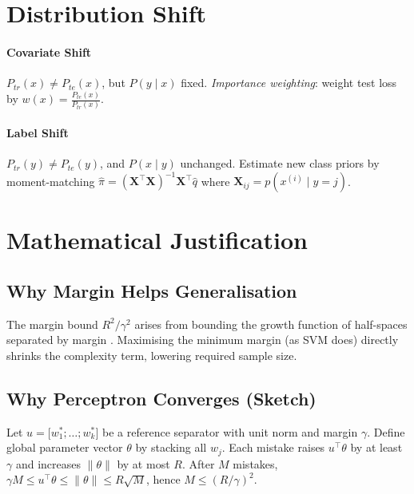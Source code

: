 \documentclass{article}
\begin{document}
\section{Distribution Shift}\label{sec:shift}
\paragraph{Covariate Shift}
$P_{tr}(x)\neq P_{te}(x)$, but $P(y\mid x)$ fixed.
\emph{Importance weighting}: weight test loss by
$w(x)=\tfrac{P_{te}(x)}{P_{tr}(x)}$.

\paragraph{Label Shift}
$P_{tr}(y)\neq P_{te}(y)$, and $P(x\mid y)$ unchanged.
Estimate new class priors by moment-matching
$\hat\pi = (\mathbf{X}^{\top}\mathbf{X})^{-1}\mathbf{X}^{\top}\hat{q}$
where $\mathbf{X}_{ij}=p(x^{(i)}\mid y=j)$.\\


\section{Mathematical Justification}\label{sec:justify}
\subsection{Why Margin Helps Generalisation}
The margin bound
$R^{2}/\gamma^{2}$ arises from
bounding the growth function of half-spaces separated by margin
\cite{bartlett1998}.
Maximising the minimum margin (as SVM does)
directly shrinks the complexity term,
lowering required sample size.

\subsection{Why Perceptron Converges (Sketch)}
Let $u=\bigl[w_{1}^{*};\dots;w_{k}^{*}\bigr]$
be a reference separator with unit norm and margin $\gamma$.
Define global parameter vector $\theta$
by stacking all $w_{j}$.
Each mistake raises $u^{\top}\theta$ by at least $\gamma$
and increases $\|\theta\|$ by at most $R$.
After $M$ mistakes,
$\gamma M \le u^{\top}\theta \le \|\theta\| \le R\sqrt{M}$,
hence $M \le (R/\gamma)^{2}$.
\end{document}

